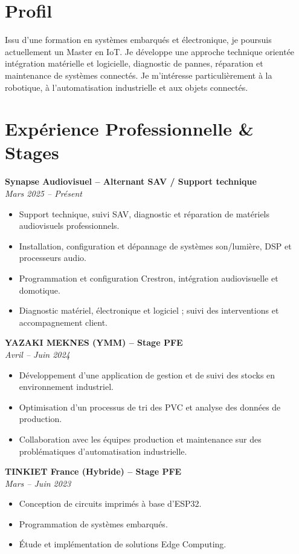 \documentclass[10pt,a4paper]{article}
\begin{document}
\begin{minipage}[t]{0.63\textwidth}

\section*{Profil}
Issu d'une formation en systèmes embarqués et électronique, je poursuis actuellement un Master en IoT. Je développe une approche technique orientée intégration matérielle et logicielle, diagnostic de pannes, réparation et maintenance de systèmes connectés. Je m'intéresse particulièrement à la robotique, à l’automatisation industrielle et aux objets connectés.

\section*{Expérience Professionnelle \& Stages}

\textbf{Synapse Audiovisuel – Alternant SAV / Support technique}\\
\textit{Mars 2025 – Présent}
\begin{itemize}
\item Support technique, suivi SAV, diagnostic et réparation de matériels audiovisuels professionnels.
\item Installation, configuration et dépannage de systèmes son/lumière, DSP et processeurs audio.
\item Programmation et configuration Crestron, intégration audiovisuelle et domotique.
\item Diagnostic matériel, électronique et logiciel ; suivi des interventions et accompagnement client.
\end{itemize}

\textbf{YAZAKI MEKNES (YMM) – Stage PFE}\\
\textit{Avril – Juin 2024}
\begin{itemize}
\item Développement d'une application de gestion et de suivi des stocks en environnement industriel.
\item Optimisation d’un processus de tri des PVC et analyse des données de production.
\item Collaboration avec les équipes production et maintenance sur des problématiques d’automatisation industrielle.
\end{itemize}

\textbf{TINKIET France (Hybride) – Stage PFE}\\
\textit{Mars – Juin 2023}
\begin{itemize}
\item Conception de circuits imprimés à base d’ESP32.
\item Programmation de systèmes embarqués.
\item Étude et implémentation de solutions Edge Computing.
\end{itemize}


\end{minipage}
\end{document}
